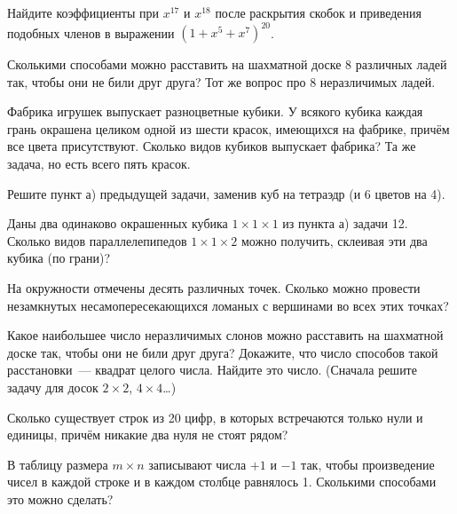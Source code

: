 \documentclass[a4paper,12pt]{article}
\begin{document}
 Найдите коэффициенты при $x^{17}$ и $x^{18}$ после раскрытия
скобок и приведения подобных членов в выражении $(1+x^5+x^7)^{20}$.


 Сколькими способами можно расставить на шахматной
доске 8 различных ладей так, чтобы они не били друг друга?
Тот же вопрос про 8 неразличимых ладей.


Фабрика игрушек выпускает разноцветные кубики. У всякого
кубика каждая грань окрашена целиком одной из шести красок,
имеющихся на фабрике, причём все цвета присутствуют.
Сколько видов кубиков выпускает фабрика?
Та же задача, но есть всего пять красок.

 Решите пункт а) предыдущей задачи, заменив куб на тетраэдр
(и 6 цветов на 4).

 Даны два одинаково окрашенных кубика $1\times1\times1$
из пункта а) задачи 12. Сколько видов параллелепипедов %
$1\times1\times2$
можно получить, склеивая эти два кубика (по грани)?


На окружности отмечены десять различных точек. Сколько можно провести
незамкнутых несамопересекающихся ломаных с вершинами во всех этих точках?


 Какое наибольшее число неразличимых слонов можно
расставить на шахматной доске так, чтобы они не били друг друга?
 Докажите, что число способов такой расстановки~--- квадрат
целого числа.
 Найдите это число. (Сначала решите
задачу для досок $2\times2$, $4\times4$\ldots)

 Сколько существует строк из 20 цифр, в которых встречаются
только нули и единицы, причём никакие два нуля не стоят рядом?

В таблицу размера $m\times n$ записывают числа
$+1$ и $-1$ так, чтобы произведение чисел в каждой строке и в каждом
столбце равнялось 1. Сколькими способами это можно сделать?
\end{document}
